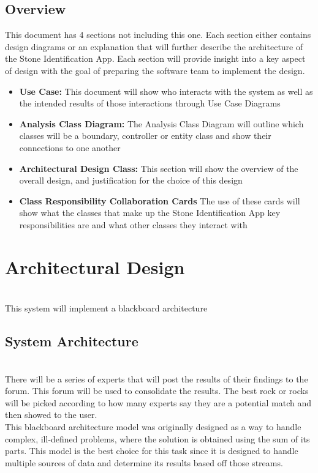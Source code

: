 \documentclass[titlepage]{article}
\begin{document}
\subsection{Overview}
This document has 4 sections not including this one. Each section either contains design diagrams or an explanation that will further describe the architecture of the Stone Identification App. Each section will provide insight into a key aspect of design with the goal of preparing the software team to implement the design.
\begin{itemize}
\item \textbf{Use Case:} This document will show who interacts with the system as well as the intended results of those interactions through Use Case Diagrams
\item \textbf{Analysis Class Diagram:} The Analysis Class Diagram will outline which classes will be a boundary, controller or entity class and show their connections to one another
\item \textbf{Architectural Design Class:} This section will show the overview of the overall design, and justification for the choice of this design
\item \textbf{Class Responsibility Collaboration Cards} The use of these cards will show what the classes that make up the Stone Identification App key responsibilities are and what other classes they interact with
\end{itemize}


\section{Architectural Design}~\\
This system will implement a blackboard architecture 
\subsection{System Architecture}~\\

There will be a series of experts that will post the results of their findings to the forum. This forum will be used to consolidate the results. The best rock or rocks will be picked according to how many experts say they are a potential match and then showed to the user.\\

This blackboard architecture model was originally designed as a way to handle complex, ill-defined problems, where the solution is obtained using the sum of its parts. This model is the best choice for this task since it is designed to handle multiple sources of data and determine its results based off those streams.\\
\end{document}
